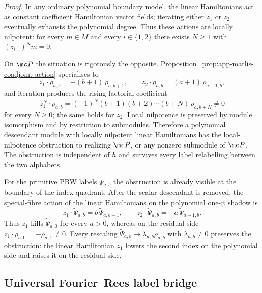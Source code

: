 \begin{proof}
  In any ordinary polynomial boundary model, the linear Hamiltonians
  act as constant coefficient Hamiltonian vector fields; iterating
  either \(z_1\) or \(z_2\) eventually exhausts the polynomial degree.
  Thus these actions are locally nilpotent: for every
  \(m\in M\) and every \(i\in\{1,2\}\) there exists \(N\geq1\) with
  \((z_i\cdot)^N m=0\).

  On \(\mc P\) the situation is rigorously the opposite.
  Proposition~\ref{prop:app-matlis-coadjoint-action} specialises to
  \[
    z_1\cdot\rho_{a,b}=-(b+1)\,\rho_{a,b+1},\qquad
    z_2\cdot\rho_{a,b}=(a+1)\,\rho_{a+1,b},
  \]
  and iteration produces the rising-factorial coefficient
  \[
    z_1^N\cdot\rho_{a,b}
      =(-1)^N(b+1)(b+2)\cdots(b+N)\,\rho_{a,b+N}\neq0
  \]
  for every \(N\geq0\); the same holds for \(z_2\).  Local nilpotence is
  preserved by module isomorphism and by restriction to submodules.
  Therefore a polynomial descendant module with locally nilpotent
  linear Hamiltonians has the local-nilpotence obstruction to realizing
  \(\mc P\), or any nonzero submodule of \(\mc P\).  The obstruction is
  independent of \(\hbar\) and survives
  every label relabelling between the two alphabets.

  For the primitive PBW labels \(\widetilde\Psi_{a,b}\) the obstruction
  is already visible at the boundary of the index quadrant.  After the
  scalar descendant is removed, the special-fibre action of the linear
  Hamiltonians on the polynomial one-\(\psi\) shadow is
  \[
    z_1\cdot\widetilde\Psi_{a,b}=b\,\widetilde\Psi_{a,b-1},
    \qquad
    z_2\cdot\widetilde\Psi_{a,b}=-a\,\widetilde\Psi_{a-1,b}.
  \]
  Thus \(z_1\) kills \(\widetilde\Psi_{a,0}\) for every \(a>0\), whereas
  on the residual side \(z_1\cdot\rho_{a,0}=-\rho_{a,1}\neq0\).  Every
  rescaling \(\widetilde\Psi_{a,b}\mapsto\lambda_{a,b}\rho_{a,b}\) with
  \(\lambda_{a,b}\neq0\) preserves the obstruction: the linear
  Hamiltonian \(z_1\) lowers the second index on the polynomial side
  and raises it on the residual side.
\end{proof}

\subsection{Universal Fourier--Rees label bridge}
\label{ssec:app-matlis-fourier-rees}

